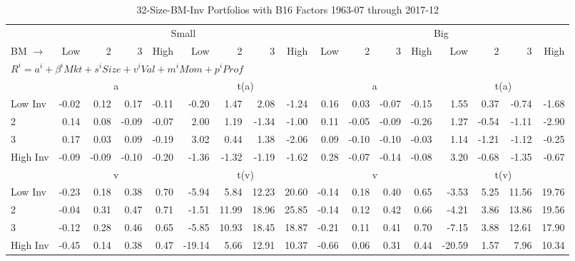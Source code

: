 
\begin{table}[!ht]
\footnotesize
\centering
\caption{32-Size-BM-Inv Portfolios with B16 Factors 1963-07 through 2017-12}
\begin{tabular}{lrrrrrrrrrrrrrrrr}
  \toprule
     & \multicolumn{8}{c}{Small} & \multicolumn{8}{c}{Big}  \\
     \cmidrule(r){2-9} \cmidrule(r){10-17}
    BM $\rightarrow$ & Low & 2 & 3 & High & Low & 2 & 3 & High & Low & 2 & 3 & High & Low & 2 & 3 & High  \\ 
  \midrule
  \multicolumn{17}{l}{$R^i=a^i+\beta^iMkt+s^iSize+v^iVal+m^iMom+p^iProf$}  \\
  
     & \multicolumn{4}{c}{a} & \multicolumn{4}{c}{t(a)}  & \multicolumn{4}{c}{a} & \multicolumn{4}{c}{t(a)}   \\
     \cmidrule(r){2-5} \cmidrule(r){6-9}  \cmidrule(r){10-13} \cmidrule(r){14-17} 
    Low Inv  & -0.02  & 0.12  & 0.17  & -0.11  & -0.20  & 1.47  & 2.08  & -1.24  & 0.16  & 0.03  & -0.07  & -0.15  & 1.55  & 0.37  & -0.74  & -1.68   \\
    2  & 0.14  & 0.08  & -0.09  & -0.07  & 2.00  & 1.19  & -1.34  & -1.00  & 0.11  & -0.05  & -0.09  & -0.26  & 1.27  & -0.54  & -1.11  & -2.90   \\
    3  & 0.17  & 0.03  & 0.09  & -0.19  & 3.02  & 0.44  & 1.38  & -2.06  & 0.09  & -0.10  & -0.10  & -0.03  & 1.14  & -1.21  & -1.12  & -0.25   \\
    High Inv  & -0.09  & -0.09  & -0.10  & -0.20  & -1.36  & -1.32  & -1.19  & -1.62  & 0.28  & -0.07  & -0.14  & -0.08  & 3.20  & -0.68  & -1.35  & -0.67   \\
   
  
     & \multicolumn{4}{c}{v} & \multicolumn{4}{c}{t(v)}  & \multicolumn{4}{c}{v} & \multicolumn{4}{c}{t(v)}   \\
     \cmidrule(r){2-5} \cmidrule(r){6-9}  \cmidrule(r){10-13} \cmidrule(r){14-17} 
    Low Inv  & -0.23  & 0.18  & 0.38  & 0.70  & -5.94  & 5.84  & 12.23  & 20.60  & -0.14  & 0.18  & 0.40  & 0.65  & -3.53  & 5.25  & 11.56  & 19.76   \\
    2  & -0.04  & 0.31  & 0.47  & 0.71  & -1.51  & 11.99  & 18.96  & 25.85  & -0.14  & 0.12  & 0.42  & 0.66  & -4.21  & 3.86  & 13.86  & 19.56   \\
    3  & -0.12  & 0.28  & 0.46  & 0.65  & -5.85  & 10.93  & 18.45  & 18.87  & -0.21  & 0.11  & 0.41  & 0.70  & -7.15  & 3.88  & 12.61  & 17.90   \\
    High Inv  & -0.45  & 0.14  & 0.38  & 0.47  & -19.14  & 5.66  & 12.91  & 10.37  & -0.66  & 0.06  & 0.31  & 0.44  & -20.59  & 1.57  & 7.96  & 10.34   \\
    

\end{tabular}
\end{table}
